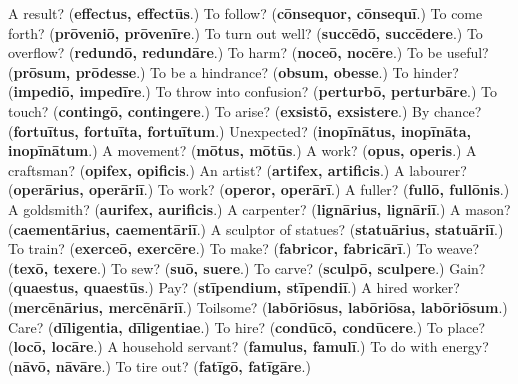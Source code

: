 \begin{tcolorbox}[breakable,colback=teal!4,colframe=teal!35!black,title={Before you move on}]
A result? (\textbf{effectus, effectūs}.) To follow? (\textbf{cōnsequor, cōnsequī}.) To come forth? (\textbf{prōveniō, prōvenīre}.) To turn out well? (\textbf{succēdō, succēdere}.) To overflow? (\textbf{redundō, redundāre}.) To harm? (\textbf{noceō, nocēre}.) To be useful? (\textbf{prōsum, prōdesse}.) To be a hindrance? (\textbf{obsum, obesse}.) To hinder? (\textbf{impediō, impedīre}.) To throw into confusion? (\textbf{perturbō, perturbāre}.) To touch? (\textbf{contingō, contingere}.) To arise? (\textbf{exsistō, exsistere}.) By chance? (\textbf{fortuītus, fortuīta, fortuītum}.) Unexpected? (\textbf{inopīnātus, inopīnāta, inopīnātum}.) A movement? (\textbf{mōtus, mōtūs}.) A work? (\textbf{opus, operis}.) A craftsman? (\textbf{opifex, opificis}.) An artist? (\textbf{artifex, artificis}.) A labourer? (\textbf{operārius, operāriī}.) To work? (\textbf{operor, operārī}.) A fuller? (\textbf{fullō, fullōnis}.) A goldsmith? (\textbf{aurifex, aurificis}.) A carpenter? (\textbf{lignārius, lignāriī}.) A mason? (\textbf{caementārius, caementāriī}.) A sculptor of statues? (\textbf{statuārius, statuāriī}.) To train? (\textbf{exerceō, exercēre}.) To make? (\textbf{fabricor, fabricārī}.) To weave? (\textbf{texō, texere}.) To sew? (\textbf{suō, suere}.) To carve? (\textbf{sculpō, sculpere}.) Gain? (\textbf{quaestus, quaestūs}.) Pay? (\textbf{stīpendium, stīpendiī}.) A hired worker? (\textbf{mercēnārius, mercēnāriī}.) Toilsome? (\textbf{labōriōsus, labōriōsa, labōriōsum}.) Care? (\textbf{dīligentia, dīligentiae}.) To hire? (\textbf{condūcō, condūcere}.) To place? (\textbf{locō, locāre}.) A household servant? (\textbf{famulus, famulī}.) To do with energy? (\textbf{nāvō, nāvāre}.) To tire out? (\textbf{fatīgō, fatīgāre}.)
\end{tcolorbox}
